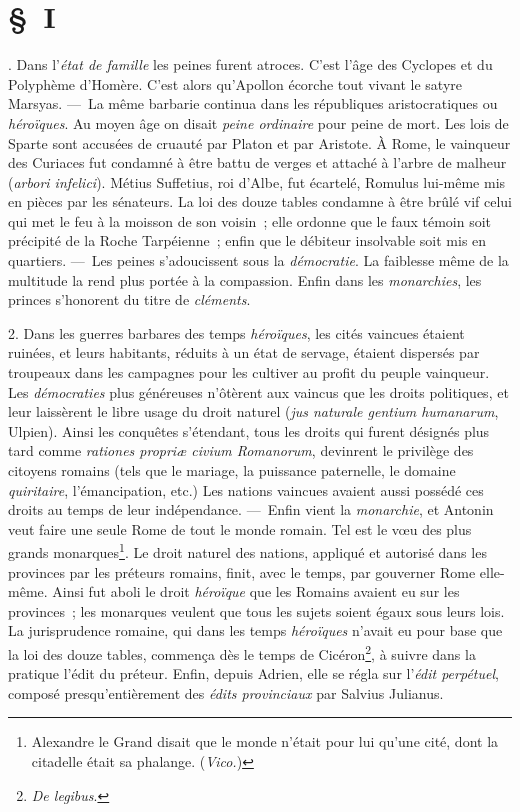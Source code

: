 \documentclass[french,twoside]{book} %
\newcommand\chaptercont{} %
\begin{document}
\chaptercont
\section[{§ I}]{§ I}
. Dans l’{\itshape état de famille} les peines furent atroces. C’est l’âge des Cyclopes et du Polyphème d’Homère. C’est alors qu’Apollon écorche tout vivant le satyre Marsyas. — La même barbarie continua dans les républiques aristocratiques ou {\itshape héroïques}. Au moyen âge on disait {\itshape peine ordinaire} pour peine de mort. Les lois de Sparte sont accusées de cruauté par Platon et par Aristote. À Rome, le vainqueur des Curiaces fut condamné à être battu de verges et attaché à l’arbre de malheur ({\itshape arbori infelici}). Métius Suffetius, roi d’Albe, fut écartelé, Romulus lui-même mis en pièces par les sénateurs. La loi des douze tables condamne à être brûlé vif celui qui met le feu à la moisson de son voisin ; elle ordonne que le faux témoin soit précipité de la Roche Tarpéienne ; enfin que le débiteur insolvable soit mis en quartiers. — Les peines s’adoucissent sous la {\itshape démocratie}. La faiblesse même de la multitude la  rend plus portée à la compassion. Enfin dans les {\itshape monarchies}, les princes s’honorent du titre de {\itshape cléments}.\par
2. Dans les guerres barbares des temps {\itshape héroïques}, les cités vaincues étaient ruinées, et leurs habitants, réduits à un état de servage, étaient dispersés par troupeaux dans les campagnes pour les cultiver au profit du peuple vainqueur. Les {\itshape démocraties} plus généreuses n’ôtèrent aux vaincus que les droits politiques, et leur laissèrent le libre usage du droit naturel (\emph{{\itshape jus naturale gentium humanarum}}, Ulpien). Ainsi les conquêtes s’étendant, tous les droits qui furent désignés plus tard comme {\itshape rationes propriæ civium Romanorum}, devinrent le privilège des citoyens romains (tels que le mariage, la puissance paternelle, le domaine {\itshape quiritaire}, l’émancipation, etc.) Les nations vaincues avaient aussi possédé ces droits au temps de leur indépendance. — Enfin vient la {\itshape monarchie}, et Antonin veut faire une seule Rome de tout le monde romain. Tel est le vœu des plus grands monarques\footnote{Alexandre le Grand disait que le monde n’était pour lui qu’une cité, dont la citadelle était sa phalange. ({\itshape Vico.})}. Le droit naturel des nations, appliqué et autorisé dans les provinces par les préteurs romains, finit, avec le temps, par gouverner Rome elle-même. Ainsi fut aboli le droit {\itshape héroïque} que les Romains avaient eu sur les provinces ; les monarques veulent que tous les sujets soient égaux sous leurs lois. La jurisprudence romaine, qui dans les temps {\itshape héroïques} n’avait eu pour base que la loi  des douze tables, commença dès le temps de Cicéron\footnote{{\itshape De legibus}.}, à suivre dans la pratique l’édit du préteur. Enfin, depuis Adrien, elle se régla sur l’{\itshape édit perpétuel}, composé presqu’entièrement des {\itshape édits provinciaux} par Salvius Julianus.\par
\end{document}
